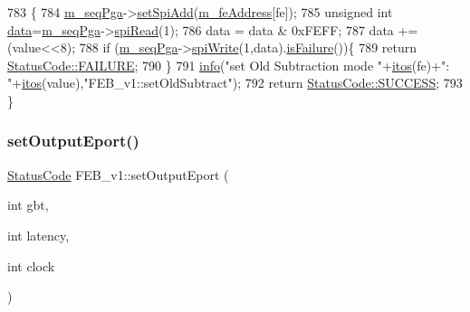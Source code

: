 \begin{DoxyCode}
783                                                      \{
784   \hyperlink{classFEB__v1_a6c7804ac86796f233a8393043adf2e77}{m\_seqPga}->\hyperlink{classSeqPGA_ac998ce3a6d9b5f2e88cc8393f8c1df53}{setSpiAdd}(\hyperlink{classFEB__v1_a4e1945c2d5b434125f375e9d0fc6d99f}{m\_feAddress}[fe]);
785   \textcolor{keywordtype}{unsigned} \textcolor{keywordtype}{int} \hyperlink{classFEB__v1_a6bca4320bd3bbbc32efc81097f33421a}{data}=\hyperlink{classFEB__v1_a6c7804ac86796f233a8393043adf2e77}{m\_seqPga}->\hyperlink{classSeqPGA_ab3d0e5e5d4014bc7a92588a76b8713d4}{spiRead}(1);
786   data = data & 0xFEFF;
787   data += (value<<8);
788   \textcolor{keywordflow}{if} (\hyperlink{classFEB__v1_a6c7804ac86796f233a8393043adf2e77}{m\_seqPga}->\hyperlink{classSeqPGA_ad4421841ce4ce8b88ad13f63216f0743}{spiWrite}(1,data).\hyperlink{classStatusCode_a5dd22dc6eb2c52fc4cabc58f6dea2eb7}{isFailure}())\{
789     \textcolor{keywordflow}{return} \hyperlink{classStatusCode_a6f565cbeadc76d14c72f047e5e85eb4ba3da73d4c469762eb9d3c960368252b26}{StatusCode::FAILURE};
790   \}
791   \hyperlink{classObject_a644fd329ea4cb85f54fa6846484b84a8}{info}(\textcolor{stringliteral}{"set Old Subtraction mode "}+\hyperlink{Tools_8h_af330027dbdafb9a30768b3613c553e60}{itos}(fe)+\textcolor{stringliteral}{": "}+\hyperlink{Tools_8h_af330027dbdafb9a30768b3613c553e60}{itos}(value),\textcolor{stringliteral}{"FEB\_v1::setOldSubtract"});
792   \textcolor{keywordflow}{return} \hyperlink{classStatusCode_a6f565cbeadc76d14c72f047e5e85eb4badd0da38d3ba0d922efd1f4619bc37ad8}{StatusCode::SUCCESS};
793 \}
\end{DoxyCode}
\mbox{\label{classFEB__v1_ae94205e374c3438e910aa39a889ebf5c}} 
\subsubsection{\texorpdfstring{set\+Output\+Eport()}{setOutputEport()}\hspace{0.1cm}{\footnotesize\ttfamily [1/2]}}
{\footnotesize\ttfamily \hyperlink{classStatusCode}{Status\+Code} F\+E\+B\+\_\+v1\+::set\+Output\+Eport (\begin{DoxyParamCaption}\item[{int}]{gbt,  }\item[{int}]{latency,  }\item[{int}]{clock }\end{DoxyParamCaption})}



